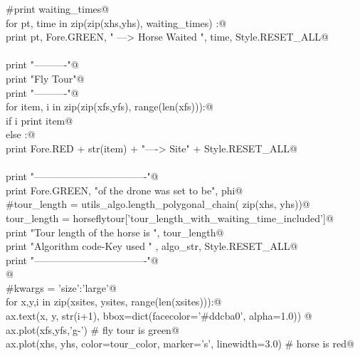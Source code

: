 \documentclass[11.5pt]{report}
\begin{document}
\begin{flushleft}
\begin{list}{}{}
\mbox{}\verb@    #print waiting_times@\\
\mbox{}\verb@    for pt, time in zip(zip(xhs,yhs), waiting_times) :@\\
\mbox{}\verb@        print pt, Fore.GREEN, " ---> Horse Waited ", time, Style.RESET_ALL@\\
\mbox{}\verb@@\\
\mbox{}\verb@    print "\n----------"@\\
\mbox{}\verb@    print "Fly Tour"@\\
\mbox{}\verb@    print "----------"@\\
\mbox{}\verb@    for item, i in zip(zip(xfs,yfs), range(len(xfs))):@\\
\mbox{}\verb@        if i%2 == 0:@\\
\mbox{}\verb@           print item@\\
\mbox{}\verb@        else :@\\
\mbox{}\verb@           print Fore.RED + str(item) + "----> Site" +  Style.RESET_ALL@\\
\mbox{}\verb@@\\
\mbox{}\verb@    print "----------------------------------"@\\
\mbox{}\verb@    print Fore.GREEN, "\nSpeed of the drone was set to be", phi@\\
\mbox{}\verb@    #tour_length = utils_algo.length_polygonal_chain( zip(xhs, yhs))@\\
\mbox{}\verb@    tour_length = horseflytour['tour_length_with_waiting_time_included']@\\
\mbox{}\verb@    print "Tour length of the horse is ",  tour_length@\\
\mbox{}\verb@    print "Algorithm code-Key used "    , algo_str, Style.RESET_ALL@\\
\mbox{}\verb@    print "----------------------------------\n"@\\
\mbox{}\verb@           @\\
\mbox{}\verb@    #kwargs = {'size':'large'}@\\
\mbox{}\verb@    for x,y,i in zip(xsites, ysites, range(len(xsites))):@\\
\mbox{}\verb@          ax.text(x, y, str(i+1), bbox=dict(facecolor='#ddcba0', alpha=1.0)) @\\
\mbox{}\verb@    ax.plot(xfs,yfs,'g-') # fly tour is green@\\
\mbox{}\verb@    ax.plot(xhs, yhs, color=tour_color, marker='s', linewidth=3.0) # horse is red@\\
\mbox{}\verb@@\\

\end{list}
\end{flushleft}
\end{document}
